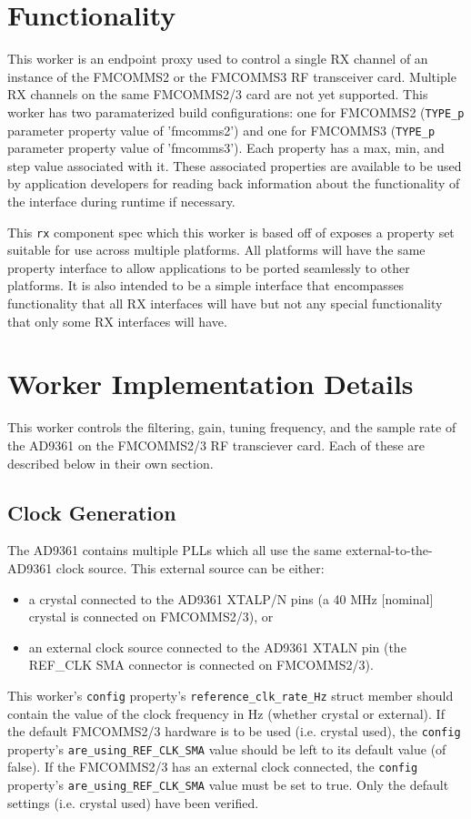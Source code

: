 \section*{Functionality}

	This worker is an endpoint proxy used to control a single RX channel of an instance of the FMCOMMS2 or the FMCOMMS3 RF transceiver card. Multiple RX channels on the same FMCOMMS2/3 card are not yet supported. This worker has two paramaterized build configurations: one for FMCOMMS2 (\verb+TYPE_p+ parameter property value of 'fmcomms2') and one for FMCOMMS3 (\verb+TYPE_p+ parameter property value of 'fmcomms3'). Each property has a max, min, and step value associated with it.  These associated properties are available to be used by application developers for reading back information about the functionality of the interface during runtime if necessary.\par\medskip
\noindent This \verb+rx+ component spec which this worker is based off of exposes a property set suitable for use across multiple platforms.  All platforms will have the same property interface to allow applications to be ported seamlessly to other platforms.  It is also intended to be a simple interface that encompasses functionality that all RX interfaces will have but not any special functionality that only some RX interfaces will have.\par\medskip

\section*{Worker Implementation Details}
This worker controls the filtering, gain, tuning frequency, and the sample rate of the AD9361 on the FMCOMMS2/3 RF transciever card.  Each of these are described below in their own section.

\subsection*{Clock Generation}
The AD9361 contains multiple PLLs which all use the same external-to-the-AD9361 clock source. This external source can be either:
\begin{itemize}
\item a crystal connected to the AD9361 XTALP/N pins (a 40 MHz [nominal] crystal is connected on FMCOMMS2/3), or
\item an external clock source connected to the AD9361 XTALN pin (the REF\_CLK SMA connector is connected on FMCOMMS2/3).
\end{itemize}
This worker's \verb+config+ property's \verb+reference_clk_rate_Hz+ struct member should contain the value of the clock frequency in Hz (whether crystal or external). If the default FMCOMMS2/3 hardware is to be used (i.e. crystal used), the \verb+config+ property's \verb+are_using_REF_CLK_SMA+ value should be left to its default value (of false). If the FMCOMMS2/3 has an external clock connected, the \verb+config+ property's \verb+are_using_REF_CLK_SMA+ value must be set to true. Only the default settings (i.e. crystal used) have been verified.
